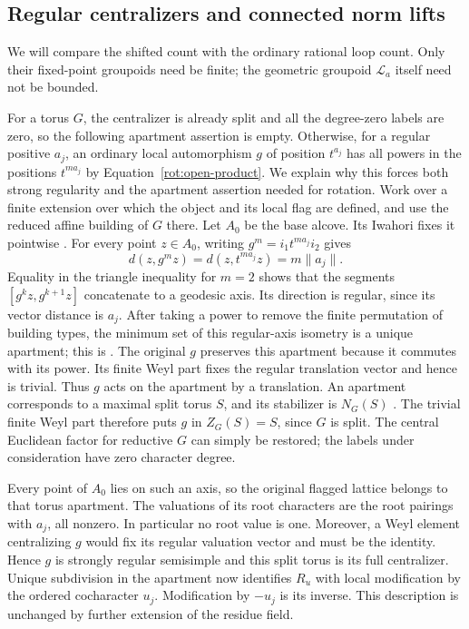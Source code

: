\subsection{Regular centralizers and connected norm lifts}

We will compare the shifted count with the ordinary rational loop
count.  Only their fixed-point groupoids need be finite; the geometric
groupoid $\mathcal L_a$ itself need not be bounded.

For a torus $G$, the centralizer is already split and all the
degree-zero labels are zero, so the following apartment assertion is
empty.  Otherwise, for a regular positive $a_j$, an ordinary local automorphism $g$ of
position $t^{a_j}$ has all powers in the positions $t^{ma_j}$ by
Equation~\eqref{rot:open-product}.  We explain why this forces both
strong regularity and the apartment assertion needed for rotation.
Work over a finite extension over which the object and its local flag
are defined, and use the reduced affine building of $G$ there.  Let
$A_0$ be the base alcove.  Its Iwahori fixes it pointwise
\cite[Sections~1.2 and~3.7]{TitsReductiveLocal}. For every
point $z\in A_0$, writing $g^m=i_1t^{ma_j}i_2$ gives
\[
 d(z,g^mz)=d(z,t^{ma_j}z)=m\|a_j\|.
\]
Equality in the triangle inequality for $m=2$ shows that the segments
$[g^kz,g^{k+1}z]$ concatenate to a geodesic axis.  Its direction is
regular, since its vector distance is $a_j$.  After taking a power to
remove the finite permutation of building types, the minimum set of
this regular-axis isometry is a unique apartment; this is
\cite[Lemma~2.3]{CapraceCiobotaru}.  The original $g$ preserves this
apartment because it commutes with its power.  Its finite Weyl part
fixes the regular translation vector and hence is trivial.  Thus $g$
acts on the apartment by a translation. An apartment corresponds to a
maximal split torus $S$, and its stabilizer is $N_G(S)$
\cite[Section~2.1]{TitsReductiveLocal}. The trivial finite Weyl part
therefore puts $g$ in $Z_G(S)=S$, since $G$ is split. The central
Euclidean factor for reductive $G$ can simply be restored; the labels
under consideration have zero character degree.

Every point of $A_0$ lies on such an axis, so the original flagged
lattice belongs to that torus apartment.  The valuations of its root
characters are the root pairings with $a_j$, all nonzero.  In particular
no root value is one.  Moreover, a Weyl element centralizing $g$ would
fix its regular valuation vector and must be the identity.  Hence $g$
is strongly regular semisimple and this split torus is its full
centralizer.  Unique subdivision in the apartment now
identifies $R_u$ with local modification by the ordered cocharacter
$u_j$.  Modification by $-u_j$ is its inverse.  This description is
unchanged by further extension of the residue field.


